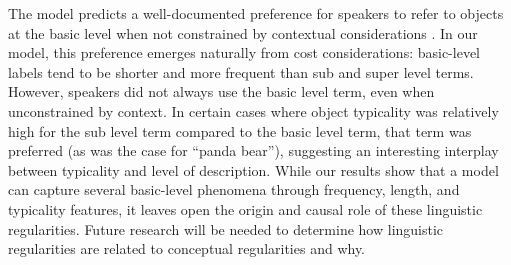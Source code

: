 \documentclass[10pt,letterpaper]{article}
\newcommand{\ndg}[1]{\textcolor{Green}{[ndg: #1]}}
\newcommand{\caroline}[1]{\textcolor{Red}{#1}}
\begin{document}
The model predicts a well-documented preference for speakers  to refer to objects at the basic level when not constrained by contextual considerations  \cite{RoschEtAl76_BasicLevel}. In our model, this preference emerges naturally from cost considerations: basic-level labels tend to be shorter and more frequent than sub and super level terms. However, speakers did not always use the basic level term, even when unconstrained by context. In certain cases where object typicality was relatively high for the sub level term compared to the basic level term, that term was preferred (as was the case for ``panda bear''), suggesting an interesting interplay between typicality and level of description. 
While our results show that a model can capture several basic-level phenomena through frequency, length, and typicality features, it leaves open the origin and causal role of these linguistic regularities.
Future research will be needed to determine how linguistic regularities are related to conceptual regularities and why.



%
%
\end{document}
